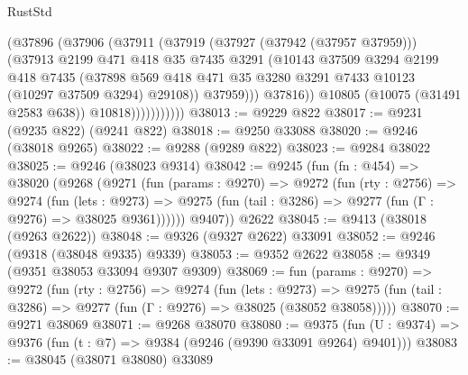 \begin{lexlean}{RustStd}
\begin{coremodule}
                          (@37896
                            (@37906
                              (@37911
                                (@37919
                                  (@37927 (@37942 (@37957 @37959)))
                                  (@37913
                                    @2199
                                    @471
                                    @418
                                    @35
                                    @7435
                                    @3291
                                    (@10143
                                      @37509
                                      @3294
                                      @2199
                                      @418
                                      @7435
                                      (@37898
                                        @569
                                        @418
                                        @471
                                        @35
                                        @3280
                                        @3291
                                        @7433
                                        @10123
                                        (@10297 @37509 @3294)
                                        @29108))
                                    @37959)))
                              @37816))
                          @10805
                          (@10075 (@31491 @2583 @638))
                          @10818)))))))))))
@38013 := @9229 @822
@38017 := @9231 (@9235 @822) (@9241 @822)
@38018 := @9250 @33088
@38020 := @9246 (@38018 @9265)
@38022 := @9288 (@9289 @822)
@38023 := @9284 @38022
@38025 := @9246 (@38023 @9314)
@38042 := @9245
    (fun (fn : @454) =>
    @38020
      (@9268
        (@9271
          (fun (params : @9270) =>
          @9272
            (fun (rty : @2756) =>
            @9274
              (fun (lets : @9273) =>
              @9275 (fun (tail : @3286) => @9277 (fun (Γ : @9276) => @38025 @9361))))))
        @9407))
    @2622
@38045 := @9413 (@38018 (@9263 @2622))
@38048 := @9326 (@9327 @2622) @33091
@38052 := @9246 (@9318 (@38048 @9335) @9339)
@38053 := @9352 @2622
@38058 := @9349 (@9351 @38053 @33094 @9307 @9309)
@38069 := fun (params : @9270) =>
  @9272
    (fun (rty : @2756) =>
    @9274
      (fun (lets : @9273) =>
      @9275 (fun (tail : @3286) => @9277 (fun (Γ : @9276) => @38025 (@38052 @38058)))))
@38070 := @9271 @38069
@38071 := @9268 @38070
@38080 := @9375
    (fun (U : @9374) => @9376 (fun (t : @7) => @9384 (@9246 (@9390 @33091 @9264) @9401)))
@38083 := @38045 (@38071 @38080) @33089

\end{coremodule}
\end{lexlean}
